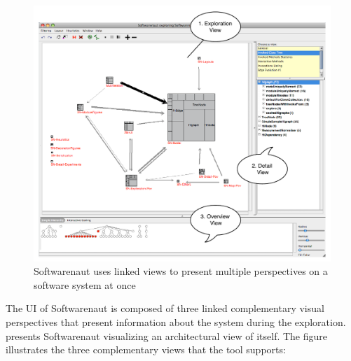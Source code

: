 \documentclass[preprint,12pt]{elsarticle}
\begin{document}
\begin{figure}[h]
\begin{center}
\includegraphics[width=0.8\linewidth]{images/SnautOnSnaut}
\caption{Softwarenaut uses linked views to present multiple perspectives on a software system at once}
\end{center}
\end{figure}

The UI of Softwarenaut is composed of three linked complementary visual perspectives that present information about the system during the exploration.  presents Softwarenaut visualizing an architectural view of itself. The figure illustrates the three complementary views that the tool supports:
\end{document}
